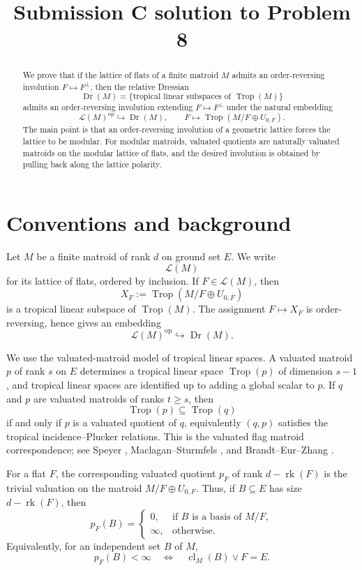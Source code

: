 \documentclass[11pt]{article}
\newcommand{\Trop}{\operatorname{Trop}}
\newcommand{\Dr}{\operatorname{Dr}}
\newcommand{\rk}{\operatorname{rk}}
\newcommand{\cl}{\operatorname{cl}}
\newcommand{\cL}{\mathcal L}
\theoremstyle{plain}
\theoremstyle{definition}
\begin{document}
\title{Submission C solution to Problem 8}
\date{}
\maketitle

\begin{abstract}
We prove that if the lattice of flats of a finite matroid \(M\) admits an order-reversing involution \(F\mapsto F^\perp\), then the relative Dressian
\[
   \Dr(M)=\{\text{tropical linear subspaces of }\Trop(M)\}
\]
admits an order-reversing involution extending \(F\mapsto F^\perp\) under the natural embedding
\[
   \cL(M)^{\operatorname{op}}\hookrightarrow \Dr(M),\qquad
   F\longmapsto \Trop(M/F\oplus U_{0,F}).
\]
The main point is that an order-reversing involution of a geometric lattice forces the lattice to be modular.  For modular matroids, valuated quotients are naturally valuated matroids on the modular lattice of flats, and the desired involution is obtained by pulling back along the lattice polarity.
\end{abstract}

\section{Conventions and background}

Let \(M\) be a finite matroid of rank \(d\) on ground set \(E\).  We write
\[
  \cL(M)
\]
for its lattice of flats, ordered by inclusion.  If \(F\in \cL(M)\), then
\[
  X_F:=\Trop(M/F\oplus U_{0,F})
\]
is a tropical linear subspace of \(\Trop(M)\).  The assignment \(F\mapsto X_F\) is order-reversing, hence gives an embedding
\[
   \cL(M)^{\operatorname{op}}\hookrightarrow \Dr(M).
\]

We use the valuated-matroid model of tropical linear spaces.  A valuated matroid \(p\) of rank \(s\) on \(E\) determines a tropical linear space \(\Trop(p)\) of dimension \(s-1\), and tropical linear spaces are identified up to adding a global scalar to \(p\).  If \(q\) and \(p\) are valuated matroids of ranks \(t\ge s\), then
\[
   \Trop(p)\subseteq \Trop(q)
\]
if and only if \(p\) is a valuated quotient of \(q\), equivalently \((q,p)\) satisfies the tropical incidence--Plucker relations.  This is the valuated flag matroid correspondence; see Speyer \cite{SpeyerTLS}, Maclagan--Sturmfels \cite[Ch.~4]{MS}, and Brandt--Eur--Zhang \cite{BEZ}.

For a flat \(F\), the corresponding valuated quotient \(p_F\) of rank \(d-\rk(F)\) is the trivial valuation on the matroid \(M/F\oplus U_{0,F}\).  Thus, if \(B\subseteq E\) has size \(d-\rk(F)\), then
\[
   p_F(B)=
   \begin{cases}
   0, & \text{if } B \text{ is a basis of }M/F,\\
   \infty, & \text{otherwise}.
   \end{cases}
\]
Equivalently, for an independent set \(B\) of \(M\),
\[
   p_F(B)<\infty
   \quad\Longleftrightarrow\quad
   \cl_M(B)\vee F=E.
\]
\end{document}
